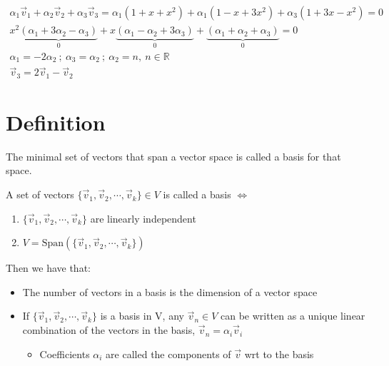 \documentclass[a4paper, 11pt, normalem]{report}
\newcommand\R{\mathbb{R}}
\begin{document}
\begin{enumerate}
\begin{gather*}
                \alpha_{1}\vec{v}_{1} + \alpha_{2}\vec{v}_{2} + \alpha_{3}\vec{v}_{3} = \alpha_{1}(1 + x + x^2) + \alpha_{1}(1 - x + 3x^2) + \alpha_{3}(1 + 3x - x^2) = 0 \\
                x^{2}\underbrace{(\alpha_{1} + 3\alpha_2 - \alpha_3)}_{0} + x\underbrace{(\alpha_1 - \alpha_2 + 3\alpha_3)}_{0} + \underbrace{(\alpha_1 + \alpha_2 + \alpha_3)}_{0} = 0 \\
                \alpha_1 = -2\alpha_2 ~;~ \alpha_3 = \alpha_2 ~;~ \alpha_2 = n,~n \in \R \\
                \vec{v}_3 = 2\vec{v}_1 - \vec{v}_2
            \end{gather*}
\end{enumerate}

\section{Definition}
The minimal set of vectors that span a vector space is called a basis for that space.

A set of vectors $\{\vec{v}_{1},\vec{v}_{2},\cdots,\vec{v}_{k}\} \in V$ is called a basis $\iff$
\begin{enumerate}
    \item $\{\vec{v}_{1},\vec{v}_{2},\cdots,\vec{v}_{k}\}$ are linearly independent
    \item $V = \text{Span}(\{\vec{v}_{1},\vec{v}_{2},\cdots,\vec{v}_{k}\})$
\end{enumerate}

Then we have that:
\begin{itemize}
    \item The number of vectors in a basis is the dimension of a vector space
    \item If $\{\vec{v}_{1},\vec{v}_{2},\cdots,\vec{v}_{k}\}$ is a basis in V, any $\vec{v}_n \in V$ can be written as a unique linear combination of the vectors in the basis, $\vec{v}_n = \alpha_i \vec{v}_i$
        \begin{itemize}
            \item Coefficients $\alpha_i$ are called the components of $\vec{v}$ wrt to the basis
        \end{itemize}
\end{itemize}
\end{document}
